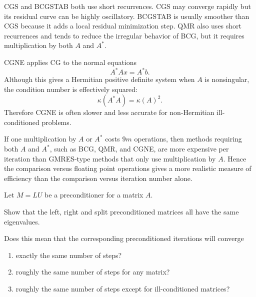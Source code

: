 \documentclass{ctexart}
\begin{document}
\begin{solution}
\begin{enumerate}[label=(\alph*)]
      CGS and BCGSTAB both use short recurrences. CGS may converge rapidly but
      its residual curve can be highly oscillatory. BCGSTAB is usually smoother
      than CGS because it adds a local residual minimization step. QMR also uses
      short recurrences and tends to reduce the irregular behavior of BCG, but
      it requires multiplication by both \(A\) and \(A^*\).

      CGNE applies CG to the normal equations
      \[
        A^*Ax=A^*b.
      \]
      Although this gives a Hermitian positive definite system when \(A\) is
      nonsingular, the condition number is effectively squared:
      \[
        \kappa(A^*A)=\kappa(A)^2.
      \]
      Therefore CGNE is often slower and less accurate for non-Hermitian
      ill-conditioned problems.

      If one multiplication by \(A\) or \(A^*\) costs \(9m\) operations, then
      methods requiring both \(A\) and \(A^*\), such as BCG, QMR, and CGNE,
      are more expensive per iteration than GMRES-type methods that only use
      multiplication by \(A\). Hence the comparison versus floating point
      operations gives a more realistic measure of efficiency than the
      comparison versus iteration number alone.
  \end{enumerate}
\end{solution}
\begin{problem}\label{pro:5}
  Let $M=LU$ be a preconditioner for a matrix $A$.

  Show that the left, right and split preconditioned matrices all have the same eigenvalues.

  Does this mean that the corresponding preconditioned iterations will converge

  \begin{enumerate}[label=(\alph*)]
    \item
      exactly the same number of steps?

    \item
      roughly the same number of steps for any matrix?

    \item
      roughly the same number of steps except for ill-conditioned matrices?
  \end{enumerate}
\end{problem}
\end{document}

